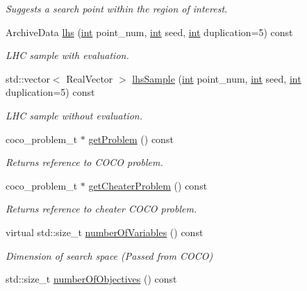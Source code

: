 \begin{DoxyCompactItemize}
\begin{DoxyCompactList}\small\item\em Suggests a search point within the region of interest. \end{DoxyCompactList}\item 
Archive\+Data \hyperlink{classCOCOfunc_a58a3396eaf1270cbafa023237e44266d}{lhs} (\hyperlink{classint}{int} point\+\_\+num, \hyperlink{classint}{int} seed, \hyperlink{classint}{int} duplication=5) const
\begin{DoxyCompactList}\small\item\em L\+HC sample with evaluation. \end{DoxyCompactList}\item 
std\+::vector$<$ Real\+Vector $>$ \hyperlink{classCOCOfunc_ab45f933b1b59a3d0be4ce9fa83bc307e}{lhs\+Sample} (\hyperlink{classint}{int} point\+\_\+num, \hyperlink{classint}{int} seed, \hyperlink{classint}{int} duplication=5) const
\begin{DoxyCompactList}\small\item\em L\+HC sample without evaluation. \end{DoxyCompactList}\item 
coco\+\_\+problem\+\_\+t $\ast$ \hyperlink{classCOCOfunc_a8af39fc2cc018f4ff0343c613d8132c3}{get\+Problem} () const\hypertarget{classCOCOfunc_a8af39fc2cc018f4ff0343c613d8132c3}{}\label{classCOCOfunc_a8af39fc2cc018f4ff0343c613d8132c3}

\begin{DoxyCompactList}\small\item\em Returns reference to C\+O\+CO problem. \end{DoxyCompactList}\item 
coco\+\_\+problem\+\_\+t $\ast$ \hyperlink{classCOCOfunc_aaed270701e406fe2c3bc8e86ac69d3b3}{get\+Cheater\+Problem} () const\hypertarget{classCOCOfunc_aaed270701e406fe2c3bc8e86ac69d3b3}{}\label{classCOCOfunc_aaed270701e406fe2c3bc8e86ac69d3b3}

\begin{DoxyCompactList}\small\item\em Returns reference to cheater C\+O\+CO problem. \end{DoxyCompactList}\item 
virtual std\+::size\+\_\+t \hyperlink{classCOCOfunc_a8690a176427c8d17fe12b183dfa205fd}{number\+Of\+Variables} () const\hypertarget{classCOCOfunc_a8690a176427c8d17fe12b183dfa205fd}{}\label{classCOCOfunc_a8690a176427c8d17fe12b183dfa205fd}

\begin{DoxyCompactList}\small\item\em Dimension of search space (Passed from C\+O\+CO) \end{DoxyCompactList}\item 
std\+::size\+\_\+t \hyperlink{classCOCOfunc_a0d46ada22e366ec1b13a69049d44677b}{number\+Of\+Objectives} () const\hypertarget{classCOCOfunc_a0d46ada22e366ec1b13a69049d44677b}{}\label{classCOCOfunc_a0d46ada22e366ec1b13a69049d44677b}


\end{DoxyCompactItemize}
